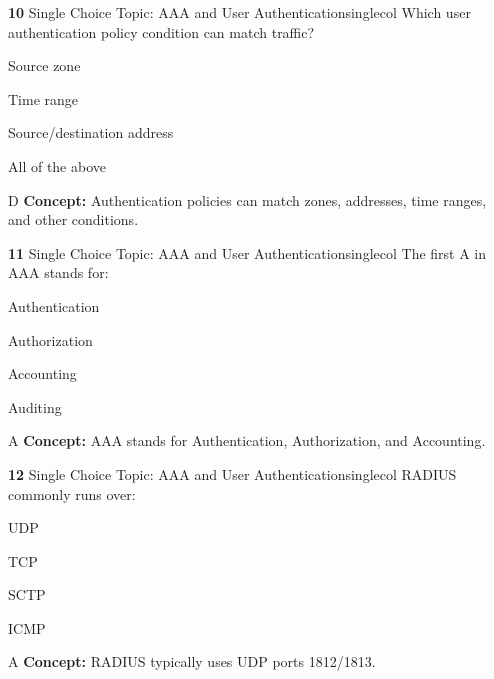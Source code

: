 \documentclass[10pt,a4paper]{article}
\begin{document}
\begin{qcard}{\color{white}\textbf{10} \hfill \small Single Choice \textbar{} Topic: AAA and User Authentication}{singlecol}
Which user authentication policy condition can match traffic?

\begin{qoptions}
\item Source zone
\item Time range
\item Source/destination address
\item All of the above
\end{qoptions}
\begin{explainbox}{D}
\textbf{Concept:} Authentication policies can match zones, addresses, time ranges, and other conditions.
\end{explainbox}
\end{qcard}

\begin{qcard}{\color{white}\textbf{11} \hfill \small Single Choice \textbar{} Topic: AAA and User Authentication}{singlecol}
The first A in AAA stands for:

\begin{qoptions}
\item Authentication
\item Authorization
\item Accounting
\item Auditing
\end{qoptions}
\begin{explainbox}{A}
\textbf{Concept:} AAA stands for Authentication, Authorization, and Accounting.
\end{explainbox}
\end{qcard}

\begin{qcard}{\color{white}\textbf{12} \hfill \small Single Choice \textbar{} Topic: AAA and User Authentication}{singlecol}
RADIUS commonly runs over:

\begin{qoptions}
\item UDP
\item TCP
\item SCTP
\item ICMP
\end{qoptions}
\begin{explainbox}{A}
\textbf{Concept:} RADIUS typically uses UDP ports 1812/1813.
\end{explainbox}
\end{qcard}
\end{document}
